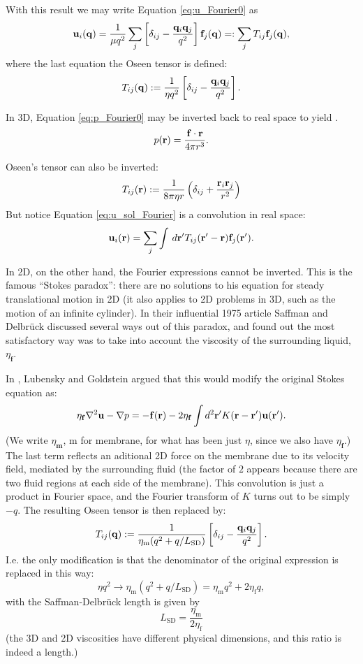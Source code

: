 With this result we may write Equation \ref{eq:u_Fourier0} as
\begin{equation}
\label{eq:u_sol_Fourier}
\mathbf{u}_i(\mathbf{q}) = \frac 1{\mu q^2}
\sum_j
\left[ \delta_{ij} - \frac{ \mathbf{q}_i  \mathbf{q}_j}{q^2} \right]
\mathbf{f}_j(\mathbf{q}) =: \sum_j T_{ij} \mathbf{f}_j(\mathbf{q}),
\end{equation}
%
where the last equation the Oseen tensor is defined:
\[
T_{ij}(\mathbf{q}) := \frac 1{\eta q^2} \left[
  \delta_{ij} - \frac{ \mathbf{q}_i  \mathbf{q}_j}{q^2} 
\right].
\]

In 3D, Equation \ref{eq:p_Fourier0} may be inverted back to real space
to yield \cite{book_creep}.
\[
p(\mathbf{r}) = \frac{\mathbf{f}\cdot\mathbf{r}}{4\pi r^3} .
\]

Oseen's tensor can also be inverted:
\[
T_{ij}(\mathbf{r}) :=  \frac 1{8\pi \eta r} 
\left(
  \delta_{ij} + \frac{ \mathbf{r}_i  \mathbf{r}_j}{r^2}
\right)
\]
But notice Equation \ref{eq:u_sol_Fourier} is a convolution in
real space:
\begin{equation}
\label{eq:u_sol_real}
\mathbf{u}_i(\mathbf{r}) =  \sum_j \int \,d\mathbf{r}' T_{ij}(\mathbf{r}'-\mathbf{r}) \mathbf{f}_j(\mathbf{r}') .
\end{equation}

In 2D, on the other hand, the Fourier expressions cannot be
inverted. This is the famous ``Stokes paradox'': there are no
solutions to his equation for steady translational motion in 2D (it
also applies to 2D problems in 3D, such as the motion of an infinite
cylinder). In their influential 1975 article
\cite{saffman1975brownian} Saffman and Delbr{\"u}ck discussed several
ways out of this paradox, and found out the most satisfactory way was
to take into account the viscosity of the surrounding liquid,
$ \eta_\mathbf{f}$.

In \cite{lubensky1996hydrodynamics}, Lubensky and Goldstein argued
that this would modify the original Stokes equation as:
\[
\eta_\mathbf{f} \nabla^2 \mathbf{u} -\nabla p = - \mathbf{f}(\mathbf{r}) - 2
\eta_\mathbf{f} \int d^2\mathbf{r'} K(\mathbf{r}-\mathbf{r'})
\mathbf{u}(\mathbf{r'}) .
\]
(We write $\eta_\mathbf{m}$, m for membrane, for what has been just
$\eta$, since we also have $\eta_\mathbf{f}$.)  The last term reflects
an aditional 2D force on the membrane due to its velocity field,
mediated by the surrounding fluid (the factor of $2$ appears because
there are two fluid regions at each side of the membrane). This
convolution is just a product in Fourier space, and the Fourier
transform of $K$ turns out to be simply $-q$.  The resulting Oseen
tensor is then replaced by:
\begin{equation}
\label{eq:SD}
T_{ij}(\mathbf{q}) := \frac 1{\eta_\mathrm{m} (q^2 + q / L_\mathrm{SD})}
\left[ \delta_{ij} - \frac{ \mathbf{q}_i \mathbf{q}_j}{q^2} \right].
\end{equation}
I.e. the only modification is that the denominator of the original
expression is replaced in this way:
\[
\eta q^2 \rightarrow
\eta_\mathrm{m} (q^2 + q / L_\mathrm{SD}) =
\eta_\mathrm{m} q^2 + 2 \eta_\mathrm{f} q ,
\]
with the Saffman-Delbr{\"u}ck length is given by
\[
L_\mathrm{SD} = \frac{\eta_\mathrm{m} }{ 2 \eta_\mathrm{f} } 
\]
(the 3D and 2D viscosities have different physical dimensions, and
this ratio is indeed a length.)


